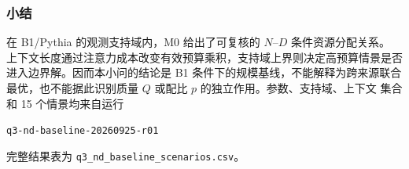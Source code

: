 \subsubsection{小结}

在 B1/Pythia 的观测支持域内，M0 给出了可复核的 $N$--$D$ 条件资源分配关系。
上下文长度通过注意力成本改变有效预算乘积，支持域上界则决定高预算情景是否
进入边界解。因而本小问的结论是 B1 条件下的规模基线，不能解释为跨来源联合
最优，也不能据此识别质量 $Q$ 或配比 $p$ 的独立作用。参数、支持域、上下文
集合和 15 个情景均来自运行
\begin{center}
{\scriptsize\texttt{q3-nd-baseline-20260925-r01}}
\end{center}
完整结果表为
\texttt{q3\_nd\_baseline\_scenarios.csv}。
